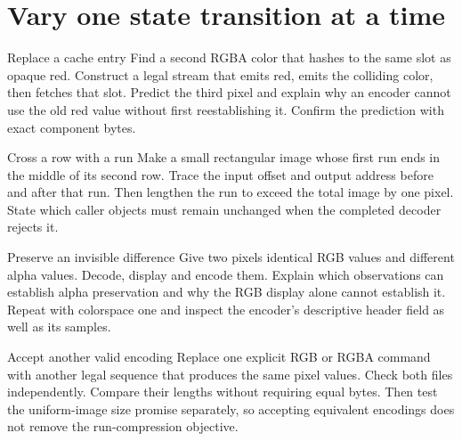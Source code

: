\section{Vary one state transition at a time}
\begin{MARSExercise}{Replace a cache entry}
  Find a second RGBA color that hashes to the same slot as opaque red. Construct a legal
  stream that emits red, emits the colliding color, then fetches that slot. Predict the
  third pixel and explain why an encoder cannot use the old red value without first
  reestablishing it. Confirm the prediction with exact component bytes.
\end{MARSExercise}

\begin{MARSExercise}{Cross a row with a run}
  Make a small rectangular image whose first run ends in the middle of its second row.
  Trace the input offset and output address before and after that run. Then lengthen the
  run to exceed the total image by one pixel. State which caller objects must remain
  unchanged when the completed decoder rejects it.
\end{MARSExercise}

\begin{MARSExercise}{Preserve an invisible difference}
  Give two pixels identical RGB values and different alpha values. Decode, display and
  encode them. Explain which observations can establish alpha preservation and why the
  RGB display alone cannot establish it. Repeat with colorspace one and inspect the
  encoder's descriptive header field as well as its samples.
\end{MARSExercise}

\begin{MARSExercise}{Accept another valid encoding}
  Replace one explicit RGB or RGBA command with another legal sequence that produces the
  same pixel values. Check both files independently. Compare their lengths without
  requiring equal bytes. Then test the uniform-image size promise separately, so accepting
  equivalent encodings does not remove the run-compression objective.
\end{MARSExercise}
